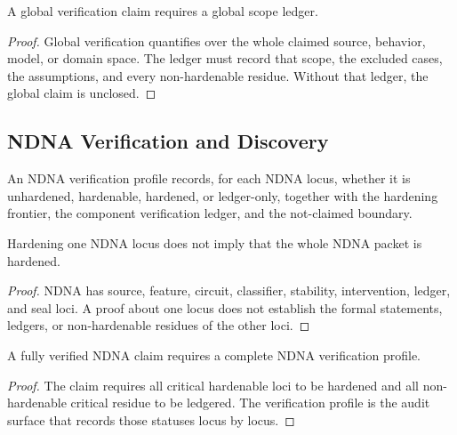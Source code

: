 \begin{theorem}
\label{thm:philosophy-global-verification-requires-global-scope-ledger}
A global verification claim requires a global scope ledger.
\end{theorem}
\begin{proof}
Global verification quantifies over the whole claimed source, behavior,
model, or domain space. The ledger must record that scope, the excluded
cases, the assumptions, and every non-hardenable residue. Without that
ledger, the global claim is unclosed.
\end{proof}

\subsection{NDNA Verification and Discovery}
\label{subsec:philosophy-ndna-verification-discovery}

\begin{definition}
\label{def:philosophy-ndna-verification-profile}
An NDNA verification profile records, for each NDNA locus, whether it is
unhardened, hardenable, hardened, or ledger-only, together with the
hardening frontier, the component verification ledger, and the
not-claimed boundary.
\end{definition}

\begin{theorem}
\label{thm:philosophy-one-hardened-ndna-locus-not-all-ndna}
Hardening one NDNA locus does not imply that the whole NDNA packet is
hardened.
\end{theorem}
\begin{proof}
NDNA has source, feature, circuit, classifier, stability, intervention,
ledger, and seal loci. A proof about one locus does not establish the
formal statements, ledgers, or non-hardenable residues of the other
loci.
\end{proof}

\begin{theorem}
\label{thm:philosophy-fully-verified-ndna-requires-profile}
A fully verified NDNA claim requires a complete NDNA verification
profile.
\end{theorem}
\begin{proof}
The claim requires all critical hardenable loci to be hardened and all
non-hardenable critical residue to be ledgered. The verification profile
is the audit surface that records those statuses locus by locus.
\end{proof}

